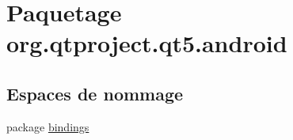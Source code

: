 \hypertarget{namespaceorg_1_1qtproject_1_1qt5_1_1android}{\section{Paquetage org.\-qtproject.\-qt5.\-android}
\label{namespaceorg_1_1qtproject_1_1qt5_1_1android}
}
\subsection*{Espaces de nommage}
\begin{DoxyCompactItemize}
\item 
package \hyperlink{namespaceorg_1_1qtproject_1_1qt5_1_1android_1_1bindings}{bindings}
\end{DoxyCompactItemize}
